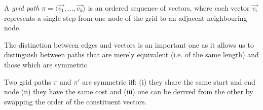 \begin{definition}
A \emph{grid path} $\pi = \langle \vec{v_1}, \ldots, \vec{v_k} \rangle$ is an ordered sequence 
of vectors, where each vector $\vec{v_i}$ represents a single step from one node of 
the grid to an adjacent neighbouring node. 
\end{definition}

The distinction between edges and vectors is an important one as it allows us to
distinguish between paths that are merely equivalent (i.e. of the same length)
and those which are symmetric. 

\begin{definition}
Two grid paths $\pi$ and $\pi'$ are symmetric iff: (i) they share the same 
start and end node (ii) they have the same cost and (iii) one can be derived from 
the other by swapping the order of the constituent vectors.
\end{definition}

